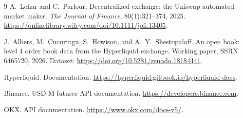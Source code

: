 \documentclass[11pt,a4paper]{article}
\begin{document}
\begin{thebibliography}{9}
A.~Lehar and C.~Parlour.
Decentralized exchange: the Uniswap automated market maker.
\emph{The Journal of Finance}, 80(1):321--374, 2025.
\url{https://onlinelibrary.wiley.com/doi/10.1111/jofi.13405}.

J.~Albers, M.~Cucuringu, S.~Howison, and A.~Y.~Shestopaloff.
An open book: level 4 order book data from the Hyperliquid exchange.
Working paper, SSRN 6465720, 2026. Dataset: \url{https://doi.org/10.5281/zenodo.18184441}.

Hyperliquid. Documentation. \url{https://hyperliquid.gitbook.io/hyperliquid-docs}.

Binance. USD-M futures API documentation. \url{https://developers.binance.com}.

OKX. API documentation. \url{https://www.okx.com/docs-v5/}.

\end{thebibliography}
\end{document}
